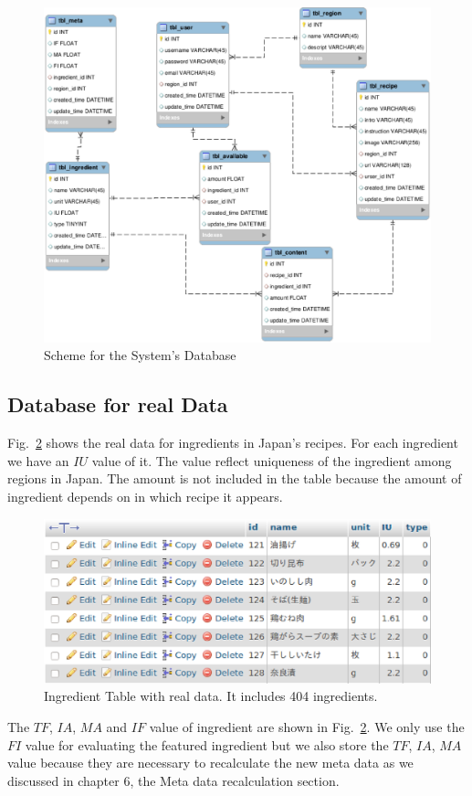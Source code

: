 \begin{figure}
\centering
\includegraphics[scale=0.5]{scheme.eps}
\caption{Scheme for the System's Database}
\label{fig:scheme}

\end{figure}

\subsection{Database for real Data}

Fig.~\ref{fig:ingredient} shows the real data for ingredients in Japan's recipes. For each ingredient we have an $IU$ value of it. The value reflect uniqueness of the ingredient among regions in Japan. The amount is not included in the table because the amount of ingredient depends on in which recipe it appears.
 
\begin{figure}
\centering
\includegraphics[scale=0.5]{ingredient.eps}
\caption{Ingredient Table with real data. It includes 404 ingredients.}
\label{fig:ingredient}
\end{figure}

The $TF$, $IA$, $MA$ and $IF$ value of ingredient are shown in Fig.~\ref{fig:ingredient}. We only use the $FI$ value for evaluating the featured ingredient but we also store the $TF$, $IA$, $MA$ value because they are necessary to recalculate the new meta data as we discussed in chapter 6, the Meta data recalculation section.

  
